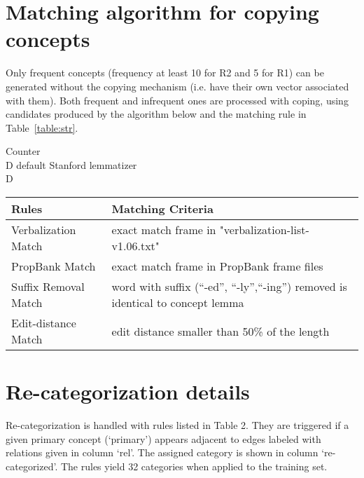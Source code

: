 \documentclass[11pt,a4paper]{article}
\begin{document}
\section{Matching algorithm for copying concepts}

Only frequent concepts  (frequency at least 10 for R2 and 5 for R1) can be generated without the copying mechanism (i.e. have their own vector  associated with them). Both frequent and infrequent ones are processed with coping, using candidates produced by the algorithm below and the matching rule in Table~\ref{table:str}.



{
\linespread{1}
\begin{algorithm}
\SetAlgoLined
{}
\Input{ }
Counter  \\

 D  default Stanford lemmatizer\\
 \Return D
 \caption{Copy function construction} \label{construct}
\end{algorithm}
}

\begin{table*}[ht!]
    \begin{center} 
        \begin{tabular}{ll} 
            \hline  Rules &   Matching Criteria \\  \hline
             Verbalization Match & exact match frame in "verbalization-list-v1.06.txt"\\
            PropBank  Match  & exact match frame in PropBank frame files\\
             Suffix Removal Match  &word with suffix (``-ed'', ``-ly'',``-ing'') removed is identical to concept lemma\\
             Edit-distance Match  &edit distance smaller than 50\% of the length  \\
            \hline
        \end{tabular}
    \end{center}
	\caption{\label{table:str} Matching rules for Algorithm 1}
\end{table*}


\section{Re-categorization details}
Re-categorization is handled with rules listed in Table 2. They are triggered if a given primary concept (`primary') appears adjacent to edges labeled with relations given in column `rel'. The assigned category is shown in column `re-categorized'. The rules yield 32 categories when applied to the training set.
\end{document}
